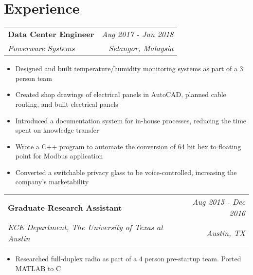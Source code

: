 \documentclass[letterpaper,11pt]{article}
\makeatletter
\newcommand{\JobSubheading}[4]{
  \vspace{-1pt}
    \begin{tabular*}{\textwidth}[t]{l@{\extracolsep{\fill}}r}
      \textbf {#1} & \textit{#2}  \\
      \textit{#3} & \textit{#4} \\
    \end{tabular*}\vspace{-5pt}
}
\makeatother
\begin{document}
\section{\color{BlueViolet} Experience}
    \vspace{-2pt}
    \JobSubheading
      {Data Center Engineer}{Aug 2017 - Jun 2018}
      {Powerware Systems}{Selangor, Malaysia}
      \vspace{-1pt}
        \begin{itemize}
            \item Designed and built temperature/humidity monitoring systems as part of a 3 person team
            \vspace{-3pt}
            \item Created shop drawings of electrical panels in AutoCAD, planned cable routing, and built electrical panels
            \vspace{-3pt}
            \item Introduced a documentation system for in-house processes, reducing the time spent on knowledge transfer 
	\vspace{-3pt}
	\item Wrote a C++ program to automate the conversion of 64 bit hex to floating point for Modbus application
          \vspace{-3pt}
	\item Converted a switchable privacy glass to be voice-controlled, increasing the company's marketability

        \end{itemize}
    \vspace{-2pt}

    \JobSubheading
      {Graduate Research Assistant}{Aug 2015 - Dec 2016}
      {ECE Department, The University of Texas at Austin}{Austin, TX}
      \vspace{-1pt}
      \begin{itemize}
        \item Researched full-duplex radio as part of a 4 person pre-startup team. Ported MATLAB to C
      \end{itemize}
    \vspace{-2pt}
    
\end{document}
